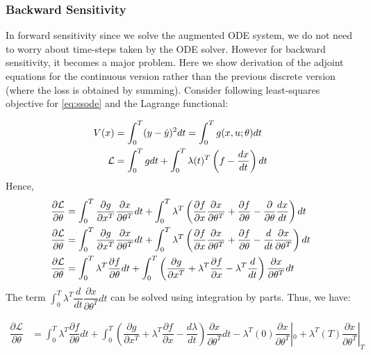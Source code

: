 \documentclass[fontsize=11pt]{article}
\theoremstyle{definition}
\begin{document}
\subsubsection{Backward Sensitivity}

In forward sensitivity since we solve the augmented ODE system, we do not need 
to worry about time-steps taken by the ODE solver. However for backward sensitivity,
it becomes a major problem. Here we show derivation of the adjoint equations for the
continuous version rather than the previous discrete version (where the loss is obtained by summing).
Consider following least-squares objective for \cref{eq:ssode} and the Lagrange functional:

\begin{align}
    V(x) &= \int_0^T (y - \hat{y})^2 dt = \int_0^T g(x, u; \theta)dt \notag \\
    \mathcal{L} &= \int_0^T g dt + \int_0^T \lambda(t)^T \left(f - \dfrac{dx}{dt}\right) dt
\end{align}
Hence,
\begin{align}
    \dfrac{\partial \mathcal{L}}{\partial \theta} &= \int_0^T \dfrac{\partial g}{\partial x^T} \dfrac{\partial x}{\partial \theta^T} dt + 
    \int_0^T \lambda^T \left(\dfrac{\partial f}{\partial x} \dfrac{\partial x}{\partial \theta^T} + \dfrac{\partial f}{\partial \theta} - \dfrac{\partial}{\partial \theta}\dfrac{dx}{dt}\right) dt \notag \\
    \dfrac{\partial \mathcal{L}}{\partial \theta} &= \int_0^T \dfrac{\partial g}{\partial x^T} \dfrac{\partial x}{\partial \theta^T} dt + 
    \int_0^T \lambda^T \left(\dfrac{\partial f}{\partial x} \dfrac{\partial x}{\partial \theta^T} + \dfrac{\partial f}{\partial \theta} - \dfrac{d}{dt}\dfrac{\partial x}{\partial \theta^T}\right) dt \notag \\
    \dfrac{\partial \mathcal{L}}{\partial \theta} &= \int_0^T \lambda^T \dfrac{\partial f}{\partial \theta} dt + \int_0^T \left(\dfrac{\partial g}{\partial x^T}
    + \lambda^T \dfrac{\partial f}{\partial x} - \lambda^T\dfrac{d}{dt}\right)\dfrac{\partial x}{\partial \theta^T} dt
\end{align}
The term $\int_0^T{\lambda^T \dfrac{d}{dt} \dfrac{\partial x}{\partial \theta^T}dt}$ 
can be solved using integration by parts. Thus, we have:

\begin{align}
    \dfrac{\partial \mathcal{L}}{\partial \theta} &= \int_0^T \lambda^T \dfrac{\partial f}{\partial \theta} dt + \int_0^T \left(\dfrac{\partial g}{\partial x^T}
    + \lambda^T \dfrac{\partial f}{\partial x} - \dfrac{d\lambda}{dt}\right)\dfrac{\partial x}{\partial \theta^T} dt - \lambda^T(0)\dfrac{\partial x}{\partial \theta^T}|_0
    + \lambda^T(T)\dfrac{\partial x}{\partial \theta^T}|_T 
    \label{eq:adjoint}
\end{align}
\end{document}
